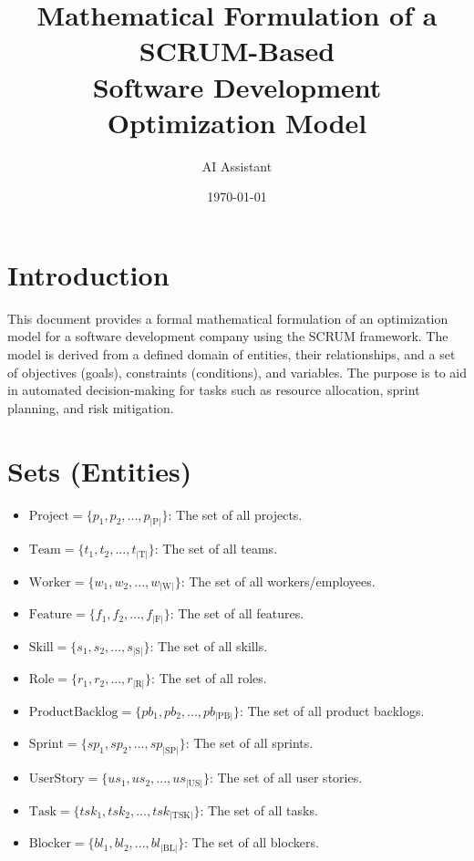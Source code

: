 \documentclass[11pt]{article}
\title{Mathematical Formulation of a SCRUM-Based \\ Software Development Optimization Model}
\author{AI Assistant}
\date{\today}
\begin{document}
\maketitle
\tableofcontents
\newpage

\section*{Introduction}
This document provides a formal mathematical formulation of an optimization model for a software development company using the SCRUM framework. The model is derived from a defined domain of entities, their relationships, and a set of objectives (goals), constraints (conditions), and variables. The purpose is to aid in automated decision-making for tasks such as resource allocation, sprint planning, and risk mitigation.

\section{Sets (Entities)}
\begin{itemize}
    \item $\text{Project} = \{p_1, p_2, ..., p_{|\text{P}|}\}$: The set of all projects.
    \item $\text{Team} = \{t_1, t_2, ..., t_{|\text{T}|}\}$: The set of all teams.
    \item $\text{Worker} = \{w_1, w_2, ..., w_{|\text{W}|}\}$: The set of all workers/employees.
    \item $\text{Feature} = \{f_1, f_2, ..., f_{|\text{F}|}\}$: The set of all features.
    \item $\text{Skill} = \{s_1, s_2, ..., s_{|\text{S}|}\}$: The set of all skills.
    \item $\text{Role} = \{r_1, r_2, ..., r_{|\text{R}|}\}$: The set of all roles.
    \item $\text{ProductBacklog} = \{pb_1, pb_2, ..., pb_{|\text{PB}|}\}$: The set of all product backlogs.
    \item $\text{Sprint} = \{sp_1, sp_2, ..., sp_{|\text{SP}|}\}$: The set of all sprints.
    \item $\text{UserStory} = \{us_1, us_2, ..., us_{|\text{US}|}\}$: The set of all user stories.
    \item $\text{Task} = \{tsk_1, tsk_2, ..., tsk_{|\text{TSK}|}\}$: The set of all tasks.
    \item $\text{Blocker} = \{bl_1, bl_2, ..., bl_{|\text{BL}|}\}$: The set of all blockers.
\end{itemize}
\end{document}

